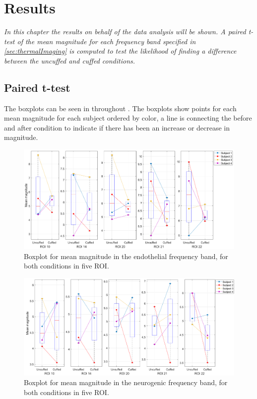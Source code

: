 \chapter{Results}
\textit{In this chapter the results on behalf of the data analysis will be shown. A paired t-test of the mean magnitude for each frequency band specified in \ref{sec:thermalImaging} is computed to test the likelihood of finding a difference between the uncuffed and cuffed conditions.}

\section{Paired t-test}
The boxplots can be seen in  throughout . The boxplots show points for each mean magnitude for each subject ordered by color, a line is connecting the before and after condition to indicate if there has been an increase or decrease in magnitude. 

\begin{figure}[H]
	\includegraphics[width=1\textwidth]{figures/boxplot_endo}
	\caption{Boxplot for mean magnitude in the endothelial frequency band, for both conditions in five ROI.}
	\label{fig:boxEndo}
\end{figure}

\begin{figure}[H]
	\includegraphics[width=1\textwidth]{figures/boxplot_neuro}
	\caption{Boxplot for mean magnitude in the neurogenic frequency band, for both conditions in five ROI.}
	\label{fig:boxNeuro}
\end{figure}

